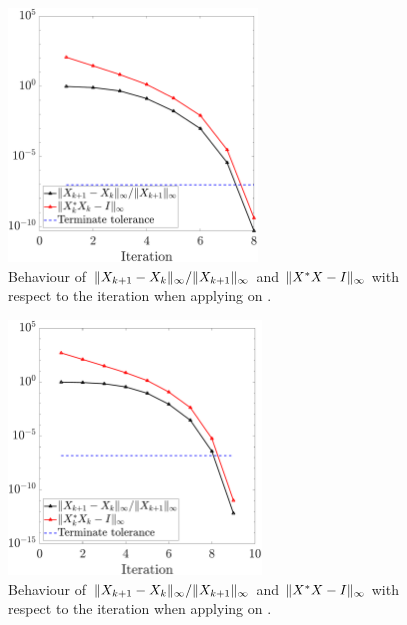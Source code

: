 \documentclass[12pt]{article}
\begin{document}
\begin{figure}[H]
    \centering
    \includegraphics[width=0.59\textwidth]{../code/randn20.pdf}
    \caption{Behaviour of $\|{X_{k+1} - X_{k}}\|_\infty/\|{X_{k+1}}\|_\infty$ and $\|{X^* X - I}\|_\infty$ with respect to the iteration when applying  on .}
\end{figure}

\begin{figure}[H]
    \centering
    \includegraphics[width=0.6\textwidth]{../code/randn50.pdf}
    \caption{Behaviour of $\|{X_{k+1} - X_{k}}\|_\infty/\|{X_{k+1}}\|_\infty$ and $\|{X^* X - I}\|_\infty$ with respect to the iteration when applying  on .}
\end{figure}
\end{document}
